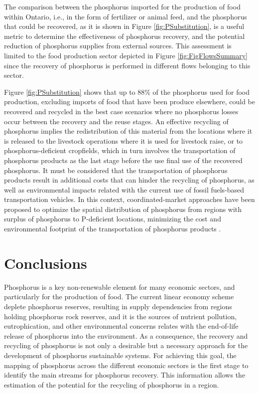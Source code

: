 \documentclass[authoryear]{elsarticle}
\begin{document}
The comparison between the phosphorus imported for the production of food within Ontario, i.e., in the form of fertilizer or animal feed, and the phosphorus that could be recovered, as it is shown in Figure \ref{fig:PSubstitution}, is a useful metric to determine the effectiveness of phosphorus recovery, and the potential reduction of phosphorus supplies from external sources. This assessment is limited to the food production sector depicted in Figure \ref{fig:FigFlowsSummary} since the recovery of phosphorus is performed in different flows belonging to this sector.

Figure \ref{fig:PSubstitution} shows that up to 88\% of the phosphorus used for food production, excluding imports of food that have been produce elsewhere, could be recovered and recycled in the best case scenarios where no phosphorus losses occur between the recovery and the reuse stages. An effective recycling of phosphorus implies the redistribution of this material from the locations where it is released to the livestock operations where it is used for livestock raise, or to phosphorus-deficient cropfields, which in turn involves the transportation of phosphorus products as the last stage before the use final use of the recovered phosphorus. It must be considered that the transportation of phosphorus products result in additional costs that can hinder the recycling of phosphorus, as well as environmental impacts related with the current use of fossil fuels-based transportation vehicles. In this context, coordinated-market approaches have been proposed to optimize the spatial distribution of phosphorus from regions with surplus of phosphorus to P-deficient locations, minimizing the cost and environmental footprint of the transportation of phosphorus products \citep{sampat2019coordinated}. 
%

\section{Conclusions}
Phosphorus is a key non-renewable element for many economic sectors, and particularly for the production of food. The current linear economy scheme deplete phosphorus reserves, resulting in supply dependencies from regions holding phosphorus rock reserves, and it is the sources of nutrient pollution, eutrophication, and other environmental concerns relates with the end-of-life release of phosphorus into the environment. As a consequence, the recovery and recycling of phosphorus is not only a desirable but a necessary approach for the development of phosphorus sustainable systems. For achieving this goal, the mapping of phosphorus across the different economic sectors is the first stage to identify the main streams for phosphorus recovery. This information allows the estimation of the potential for the recycling of phosphorus in a region.
\end{document}
